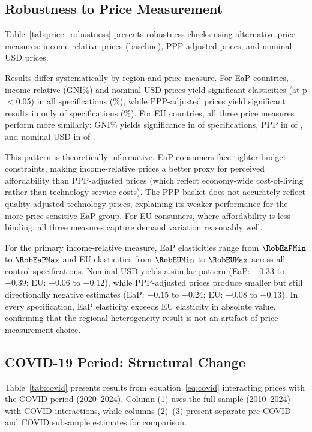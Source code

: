 \subsection{Robustness to Price Measurement}

Table~\ref{tab:price_robustness} presents robustness checks using alternative price measures: income-relative prices (baseline), PPP-adjusted prices, and nominal USD prices. 

Results differ systematically by region and price measure. For EaP countries, income-relative (GNI\%) and nominal USD prices yield significant elasticities (at p$<$0.05) in all \NPerMeasure{} specifications (\PctGNISigEaP\%), while PPP-adjusted prices yield significant results in only \CntPPPSigEaP{} of \NPerMeasure{} specifications (\PctPPPSigEaP\%). For EU countries, all three price measures perform more similarly: GNI\% yields significance in \CntGNISigEU{} of \NPerMeasure{} specifications, PPP in \CntPPPSigEU{} of \NPerMeasure{}, and nominal USD in \CntUSDSigEU{} of \NPerMeasure{}.

This pattern is theoretically informative. EaP consumers face tighter budget constraints, making income-relative prices a better proxy for perceived affordability than PPP-adjusted prices (which reflect economy-wide cost-of-living rather than technology service costs). The PPP basket does not accurately reflect quality-adjusted technology prices, explaining its weaker performance for the more price-sensitive EaP group. For EU consumers, where affordability is less binding, all three measures capture demand variation reasonably well.

For the primary income-relative measure, EaP elasticities range from $\RobEaPMin$ to $\RobEaPMax$ and EU elasticities from $\RobEUMin$ to $\RobEUMax$ across all \NPerMeasure{} control specifications. Nominal USD yields a similar pattern (EaP: $-0.33$ to $-0.39$; EU: $-0.06$ to $-0.12$), while PPP-adjusted prices produce smaller but still directionally negative estimates (EaP: $-0.15$ to $-0.24$; EU: $-0.08$ to $-0.13$). In every specification, EaP elasticity exceeds EU elasticity in absolute value, confirming that the regional heterogeneity result is not an artifact of price measurement choice.

\subsection{COVID-19 Period: Structural Change}

Table~\ref{tab:covid} presents results from equation~\eqref{eq:covid} interacting prices with the COVID period (2020--2024). Column (1) uses the full sample (2010--2024) with COVID interactions, while columns (2)--(3) present separate pre-COVID and COVID subsample estimates for comparison.

